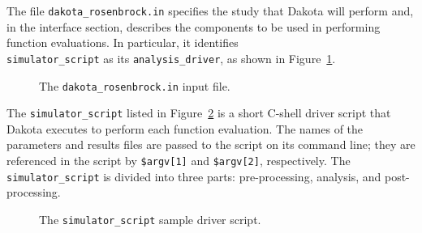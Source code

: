 The file \texttt{dakota\_rosenbrock.in} specifies the study that
Dakota will perform and, in the interface section, describes the
components to be used in performing function evaluations. In
particular, it identifies \\ \texttt{simulator\_script} as its
\texttt{analysis\_driver}, as shown in Figure~\ref{advint:figure01}.
\begin{figure}
  \centering
  \begin{bigbox}
    \begin{small}
    \end{small}
  \end{bigbox}
  \caption{The \texttt{dakota\_rosenbrock.in} input file.}
  \label{advint:figure01}
\end{figure}

The \texttt{simulator\_script} listed in Figure~\ref{advint:figure02}
is a short C-shell driver script that Dakota executes to perform each
function evaluation. The names of the parameters and results files are
passed to the script on its command line; they are
referenced in the script by \texttt{\$argv[1]}
and \texttt{\$argv[2]}, respectively. The \texttt{simulator\_script}
is divided into three parts: pre-processing, analysis, and post-processing.

\begin{figure}
  \centering
  \begin{bigbox}
    \begin{small}
    \end{small}
  \end{bigbox}
  \caption{The \texttt{simulator\_script} sample driver script.}
  \label{advint:figure02}
\end{figure}


